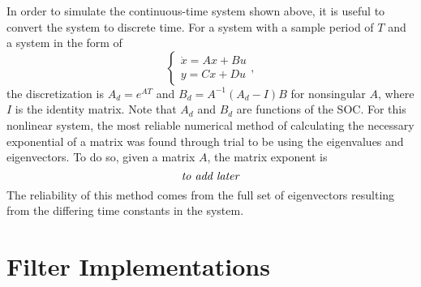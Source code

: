 \documentclass[../zhang_thesis.tex]{subfiles}
\begin{document}
In order to simulate the continuous-time system shown above, it is useful to convert the system to discrete time. For a system with a sample period of $T$ and a system in the form of
\begin{equation}
    \begin{cases}
        \dot{x} = Ax + Bu \\
        y = Cx + Du
    \end{cases},
\end{equation}
the discretization is $A_d=e^{AT}$ and $B_d=A^{-1} (A_d-I) B$ for nonsingular $A$, where $I$ is the identity matrix. Note that $A_d$ and $B_d$ are functions of the SOC. For this nonlinear system, the most reliable numerical method of calculating the necessary exponential of a matrix was found through trial to be using the eigenvalues and eigenvectors. To do so, given a matrix $A$, the matrix exponent is
\begin{equation}
    \text{\emph{to add later}}
\end{equation}
The reliability of this method comes from the full set of eigenvectors resulting from the differing time constants in the system.


\section{Filter Implementations}


\end{document}

